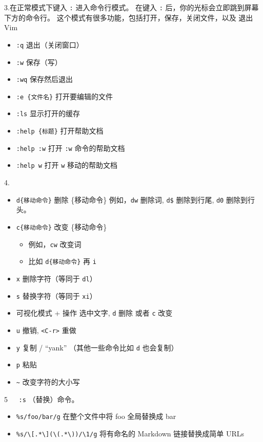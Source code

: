 \documentclass{article}
\begin{document}
3.在正常模式下键入 \verb|:| 进入命令行模式。 在键入 \verb|:| 后，你的光标会立即跳到屏幕下方的命令行。 这个模式有很多功能，包括打开，保存，关闭文件，以及 退出 Vim 
    
\begin{itemize}
    \item \verb|:q| 退出（关闭窗口）
    \item \verb|:w| 保存（写）
    \item \verb|:wq| 保存然后退出
    \item \verb|:e {文件名}| 打开要编辑的文件
    \item \verb|:ls| 显示打开的缓存
    \item \verb|:help {标题}| 打开帮助文档
        \item \verb|:help :w| 打开 \verb|:w| 命令的帮助文档
        \item \verb|:help w| 打开 \verb|w| 移动的帮助文档
\end{itemize}

   
4.
    
\begin{itemize}
    \item \verb|d{移动命令}| 删除 \{移动命令\}
例如，\verb|dw| 删除词, \verb|d$| 删除到行尾, \verb|d0| 删除到行头。

    \item \verb|c{移动命令}| 改变 \{移动命令\}
    \begin{itemize}
        \item 例如，\verb|cw| 改变词
        \item 比如 \verb|d{移动命令}| 再 \verb|i|
    \end{itemize}
    \item \verb|x| 删除字符（等同于 \verb|dl|）
    \item \verb|s| 替换字符（等同于 \verb|xi|）
    \item 可视化模式 + 操作
选中文字, \verb|d| 删除 或者 \verb|c| 改变

    \item \verb|u| 撤销, \verb|<C-r>| 重做
    \item \verb|y| 复制 / “yank” （其他一些命令比如 \verb|d| 也会复制）
    \item \verb|p| 粘贴
    \item  \verb|~| 改变字符的大小写
\end{itemize}
 
 

5\verb|   :s| （替换）命令。

\begin{itemize}
    \item \verb|%s/foo/bar/g|
在整个文件中将 foo 全局替换成 bar

    \item \verb|%s/\[.*\](\(.*\))/\1/g|
将有命名的 Markdown 链接替换成简单 URLs

\end{itemize}
 
\end{document}
